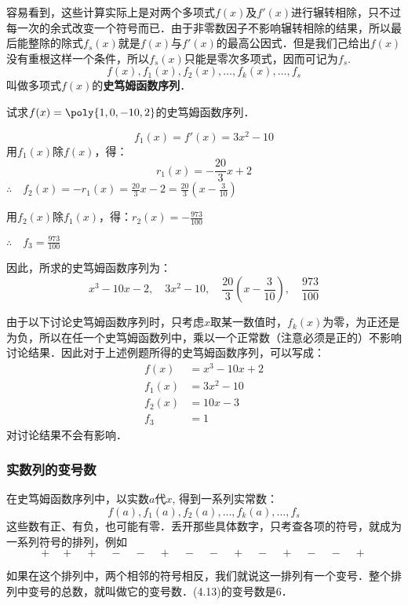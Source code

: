 容易看到，这些计算实际上是对两个多项式$f(x)$及$f'(x)$进行辗转相除，只不过每一次的余式改变一个符号而已．由于非零数因子不影响辗转相除的结果，所以最后能整除的除式$f_s(x)$就是$f(x)$与$f'(x)$的最高公因式．但是我们己给出$f(x)$没有重根这样一个条件，所以$f_s(x)$只能是零次多项式，因而可记为$f_s$.
\[f (x) ,f_1 (x) ,f_2 (x),\ldots,f_k(x),\ldots,f_s\]
叫做多项式$f(x)$的\textbf{史笃姆函数序列}．


\begin{example}
    试求$f(x)=\poly{1,0,-10,2}$的史笃姆函数序列．
\end{example}

\begin{solution}
\[f_1(x)=f'(x)=3x^2-10\]
用$f_1(x)$除$f(x)$，得：
\[r_1(x)=-\frac{20}{3}x+2\]
$\therefore\quad f_2(x)=-r_1(x)=\frac{20}{3}x-2=\frac{20}{3}\left(x-\frac{3}{10}\right)$

用$f_2(x)$除$f_1(x)$，得：$r_2(x)=-\frac{973}{100}$

$\therefore\quad f_3=\frac{973}{100}$    

因此，所求的史笃姆函数序列为：
\[x^3-10x-2,\quad 3x^2-10,\quad \frac{20}{3}\left(x-\frac{3}{10}\right),\quad \frac{973}{100}\]
\end{solution}

由于以下讨论史笃姆函数序列时，只考虑$x$取某一数值时，$f_k(x)$为零，为正还是为负，所以在任一个史笃姆函数列中，乘以一个正常数（注意必须是正的）不影响讨论结果．因此对于上述例题所得的史笃姆函数序列，可以写成：
\[\begin{split}
    f (x) &=x^3-10x+2\\
    f_1 (x) &=3x^2-10\\
    f_2 (x) &=10x-3\\
    f_3&=1
\end{split}\]
对讨论结果不会有影响．

\subsubsection{实数列的变号数}

在史笃姆函数序列中，以实数$a$代$x$, 得到一系列实常数：$$f(a),f_1(a),f_2(a),\ldots,f_k(a),\ldots, f_s$$ 这些数有正、有负，也可能有零．丢开那些具体数字，只考查各项的符号，就成为一系列符号的排列，例如
\begin{equation}
    +\quad +\quad +\quad -\quad -\quad +\quad -\quad -\quad +\quad -\quad +\quad -\quad -\quad +
\end{equation}

如果在这个排列中，两个相邻的符号相反，我们就说这一排列有一个变号．整个排列中变号的总数，就叫做它的变号数．(4.13)的变号数是6．

